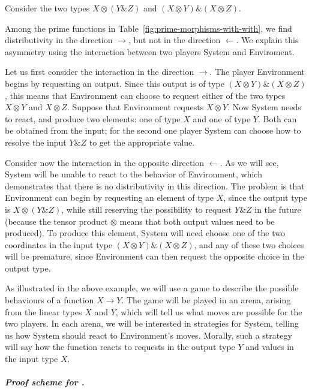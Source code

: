 \documentclass[a4paper,UKenglish,cleveref, autoref, numberwithinsect, thm-restate]{lipics-v2021}
\begin{document}
\begin{example}\label{ex:amp-otimes-distr}
    Consider the two types $X \otimes (Y \& Z)$ and $(X \otimes Y) \& (X \otimes Z)$.

    Among the prime functions in Table~\ref{fig:prime-morphisms-with-with}, we find distributivity in the direction $\rightarrow$, but not in the direction $\leftarrow$. We explain this asymmetry using the interaction between two players System and Enviroment.

    Let us first consider the interaction in the  direction $\rightarrow$. The player Environment begins by requesting an output. Since this output is of type $(X \otimes Y) \& (X \otimes Z)$, this means that Environment can choose to request either of the two types  $X \otimes Y$ and $X \otimes Z$. Suppose that Environment requests $X \otimes Y$. Now System needs to react, and produce two elements: one of type $X$ and one of type $Y$. Both can be obtained from the input; for the second one player System can choose how to resolve the input $Y \& Z$ to get the appropriate value. 

    Consider now the interaction in the opposite direction $\leftarrow$. As we will see, System will be unable to react to the behavior of Environment, which demonstrates that there is no distributivity in this direction. The problem is that Environment can begin by requesting an element of type $X$, since the output type is $X \otimes (Y \& Z)$, while still reserving the possibility to request $Y \& Z$ in the future (because the tensor product $\otimes$ means that both output values need to be produced). To produce this element, System will need  choose one of the two coordinates in the input type $(X \otimes Y) \& (X \otimes Z)$, and any of these two  choices will be premature, since Environment can then request the opposite choice in the output type.  \exampleend
\end{example}

As illustrated in the above example, we will use a game to describe the possible behaviours of a function $X \to Y$. The game will be played in an arena, arising from the linear types $X$ and $Y$, which will tell us what moves are possible for the two players. In each arena, we will be interested in strategies for System, telling us how System should react to Environment's moves. Morally, such a strategy will say how the function reacts to requests in the output type $Y$ and values in the input type $X$.

\subparagraph{Proof scheme for .}
\end{document}
